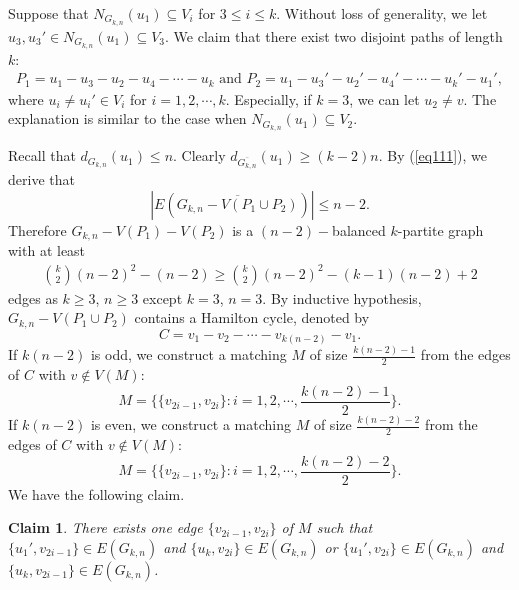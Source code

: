 \documentclass[reqno]{amsart}
\newtheorem{claim}[theorem]{Claim}
\begin{document}
Suppose that $N_{G_{k,n}}(u_1) \subseteq V_i$ for $3 \leq i \leq k$. Without loss of generality, we let $u_3,u_3' \in N_{G_{k,n}}(u_1) \subseteq V_3$.  We claim that there exist two disjoint paths of length $k$:
\begin{align*}
P_1=u_1-u_3-u_2-u_4-\cdots-u_k {  \,\, \text {and} \,\,} P_2=u_1-u_3'-u_2'-u_4'-\cdots-u_k'-u_1',
\end{align*}
where $u_i \neq u_i'\in V_i$ for $i=1,2,\cdots,k$. Especially,  if $k=3$, we can let $u_2\neq v$.  The explanation is similar to the case when $N_{G_{k,n}}(u_1) \subseteq V_2$.

Recall that $d_{G_{k,n}}(u_1) \leq n$.  Clearly  $d_{\overline{G_{k,n}}}(u_1) \geq (k-2)n$. By (\ref{eq111}), we derive  that $$|E(\overline{G_{k,n}-V(P_1\cup P_2)})| \leq n-2 .$$
Therefore $G_{k,n}-V(P_1)-V(P_2)$ is a $(n-2)-$balanced $k$-partite graph with at least
\begin{align*}
\binom{k}{2}(n-2)^{2}-(n-2) \geq \binom{k}{2}(n-2)^{2}-(k-1)(n-2)+2
\end{align*}
edges as $k\geq3$, $n\geq3$ except $k=3$, $n=3$. By inductive hypothesis, $G_{k,n}-V(P_1 \cup P_2)$ contains a Hamilton cycle, denoted by $$C = v_1-v_2-\cdots-v_{k(n-2)}-v_1.$$
If $k(n-2)$ is odd, we construct a matching $M$ of size $\frac{k(n-2)-1}{2}$ from the edges of $C$ with $v \notin V(M)$:  $$M=\Big\{\{v_{2i-1},v_{2i}\}: i=1,2,\cdots,\frac{k(n-2)-1}{2}\Big\}.$$
If $k(n-2)$ is even,  we construct a matching $M$ of size $\frac{k(n-2)-2}{2}$ from the edges of $C$ with $v \notin V(M)$:  $$M=\Big\{\{v_{2i-1},v_{2i}\}: i=1,2,\cdots,\frac{k(n-2)-2}{2}\Big\}.$$
We have the following claim.
\begin{claim}\label{claim7}
There exists one edge $\{v_{2i-1},v_{2i}\}$ of $M$ such that $\{u_1',v_{2i-1}\} \in E(G_{k,n})$ and $\{u_k,v_{2i}\}\in E(G_{k,n})$ or $\{u_1',v_{2i}\} \in E(G_{k,n})$ and $\{u_k,v_{2i-1}\}\in E(G_{k,n})$.
\end{claim}
\end{document}
